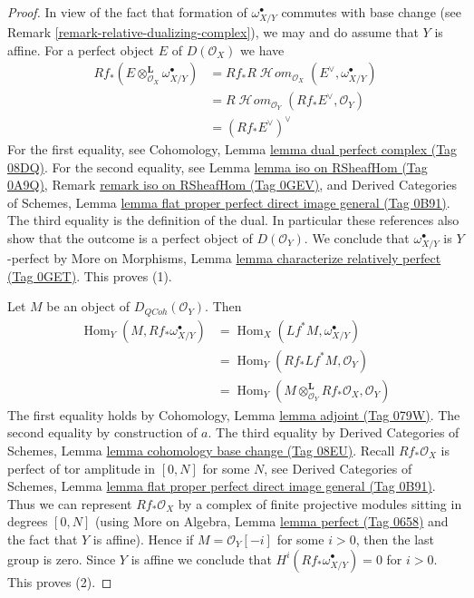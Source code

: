 \documentclass{amsart}
\theoremstyle{plain}
\theoremstyle{definition}
\theoremstyle{remark}
\numberwithin{equation}{subsection}
\def\Hom{\mathop{\mathrm{Hom}}\nolimits}
\def\SheafHom{\mathop{\mathcal{H}\!\mathit{om}}\nolimits}
\def\QCoh{\mathit{QCoh}}
\begin{document}
\begin{proof}
In view of the fact that formation of $\omega_{X/Y}^\bullet$ commutes
with base change (see Remark \ref{remark-relative-dualizing-complex}),
we may and do assume that $Y$ is affine. For a perfect object $E$ of
$D(\mathcal{O}_X)$ we have
\begin{align*}
Rf_*(E \otimes_{\mathcal{O}_X}^\mathbf{L} \omega_{X/Y}^\bullet)
& =
Rf_*R\SheafHom_{\mathcal{O}_X}(E^\vee, \omega_{X/Y}^\bullet) \\
& =
R\SheafHom_{\mathcal{O}_Y}(Rf_*E^\vee, \mathcal{O}_Y) \\
& =
(Rf_*E^\vee)^\vee
\end{align*}
For the first equality, see
Cohomology, Lemma \href{https://stacks.math.columbia.edu/tag/08DQ}{lemma dual perfect complex (Tag 08DQ)}.
For the second equality, see Lemma \href{https://stacks.math.columbia.edu/tag/0A9Q}{lemma iso on RSheafHom (Tag 0A9Q)},
Remark \href{https://stacks.math.columbia.edu/tag/0GEV}{remark iso on RSheafHom (Tag 0GEV)}, and 
Derived Categories of Schemes, Lemma
\href{https://stacks.math.columbia.edu/tag/0B91}{lemma flat proper perfect direct image general (Tag 0B91)}.
The third equality is the definition of the dual. In particular
these references also show that the outcome is a perfect object
of $D(\mathcal{O}_Y)$. We conclude that $\omega_{X/Y}^\bullet$
is $Y$-perfect by More on Morphisms, Lemma
\href{https://stacks.math.columbia.edu/tag/0GET}{lemma characterize relatively perfect (Tag 0GET)}.
This proves (1).

\medskip\noindent
Let $M$ be an object of $D_\QCoh(\mathcal{O}_Y)$. Then
\begin{align*}
\Hom_Y(M, Rf_*\omega_{X/Y}^\bullet) & =
\Hom_X(Lf^*M, \omega_{X/Y}^\bullet) \\
& =
\Hom_Y(Rf_*Lf^*M, \mathcal{O}_Y) \\
& =
\Hom_Y(M \otimes_{\mathcal{O}_Y}^\mathbf{L} Rf_*\mathcal{O}_X, \mathcal{O}_Y)
\end{align*}
The first equality holds by Cohomology, Lemma
\href{https://stacks.math.columbia.edu/tag/079W}{lemma adjoint (Tag 079W)}.
The second equality by construction of $a$.
The third equality by Derived Categories of Schemes, Lemma
\href{https://stacks.math.columbia.edu/tag/08EU}{lemma cohomology base change (Tag 08EU)}.
Recall $Rf_*\mathcal{O}_X$ is perfect of tor amplitude in $[0, N]$
for some $N$, see
Derived Categories of Schemes, Lemma
\href{https://stacks.math.columbia.edu/tag/0B91}{lemma flat proper perfect direct image general (Tag 0B91)}.
Thus we can represent $Rf_*\mathcal{O}_X$ by a complex of
finite projective modules sitting in degrees $[0, N]$
(using More on Algebra, Lemma \href{https://stacks.math.columbia.edu/tag/0658}{lemma perfect (Tag 0658)}
and the fact that $Y$ is affine).
Hence if $M = \mathcal{O}_Y[-i]$ for some $i > 0$, then the last
group is zero. Since $Y$ is affine we conclude that
$H^i(Rf_*\omega_{X/Y}^\bullet) = 0$ for $i > 0$.
This proves (2).


\end{proof}
\end{document}
